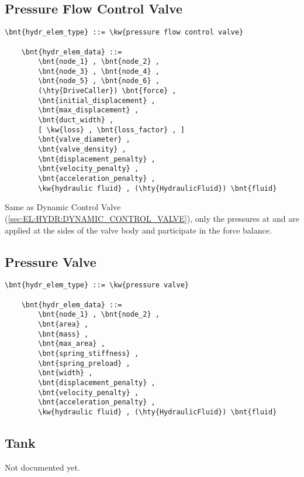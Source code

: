 \subsection{Pressure Flow Control Valve}
\label{sec:EL:HYDR:PRESSURE_FLOW_CONTROL_VALVE}
\begin{Verbatim}[commandchars=\\\{\}]
    \bnt{hydr_elem_type} ::= \kw{pressure flow control valve}

    \bnt{hydr_elem_data} ::=
        \bnt{node_1} , \bnt{node_2} ,
        \bnt{node_3} , \bnt{node_4} ,
        \bnt{node_5} , \bnt{node_6} ,
        (\hty{DriveCaller}) \bnt{force} ,
        \bnt{initial_displacement} ,
        \bnt{max_displacement} ,
        \bnt{duct_width} ,
        [ \kw{loss} , \bnt{loss_factor} , ]
        \bnt{valve_diameter} ,
        \bnt{valve_density} ,
        \bnt{displacement_penalty} ,
        \bnt{velocity_penalty} ,
        \bnt{acceleration_penalty} ,
        \kw{hydraulic fluid} , (\hty{HydraulicFluid}) \bnt{fluid}
\end{Verbatim}
Same as Dynamic Control Valve (\ref{sec:EL:HYDR:DYNAMIC_CONTROL_VALVE}),
only the pressures at  and  are applied
at the sides of the valve body and participate in the force balance.



\subsection{Pressure Valve}
\label{sec:EL:HYDR:PRESSURE_VALVE}
\begin{Verbatim}[commandchars=\\\{\}]
    \bnt{hydr_elem_type} ::= \kw{pressure valve}

    \bnt{hydr_elem_data} ::=
        \bnt{node_1} , \bnt{node_2} ,
        \bnt{area} ,
        \bnt{mass} ,
        \bnt{max_area} ,
        \bnt{spring_stiffness} ,
        \bnt{spring_preload} ,
        \bnt{width} ,
        \bnt{displacement_penalty} ,
        \bnt{velocity_penalty} ,
        \bnt{acceleration_penalty} ,
        \kw{hydraulic fluid} , (\hty{HydraulicFluid}) \bnt{fluid}
\end{Verbatim}



\subsection{Tank}
\label{sec:EL:HYDR:TANK}
Not documented yet.



